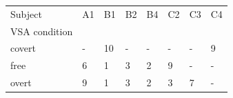 \begin{tabular}{llllllll}
	\toprule
	Subject       & A1 & B1 & B2 & B4 & C2 & C3 & C4 \\
	VSA condition &    &    &    &    &    &    &    \\
	\midrule
	covert        & -  & 10 & -  & -  & -  & -  & 9  \\
	free          & 6  & 1  & 3  & 2  & 9  & -  & -  \\
	overt         & 9  & 1  & 3  & 2  & 3  & 7  & -  \\
	\bottomrule
\end{tabular}
